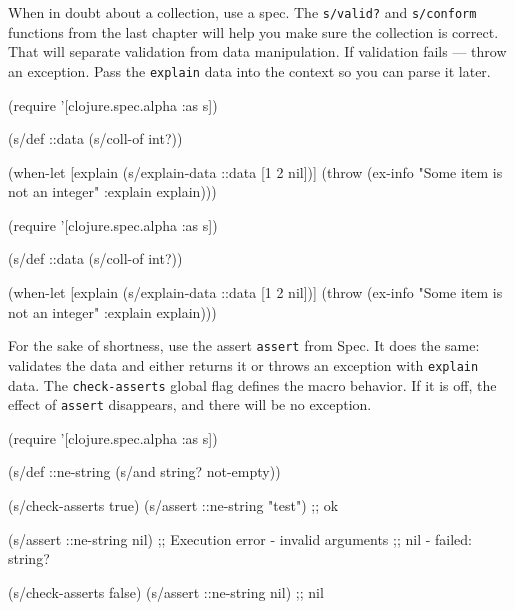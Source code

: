 
When in doubt about a collection, use a spec. The \verb|s/valid?| and \verb|s/conform| functions from the last chapter  will help you make sure the collection is correct. That will separate validation from data manipulation. If validation fails — throw an exception. Pass the \verb|explain| data into the context so you can parse it later.

\ifx\DEVICETYPE\MOBILE

\begin{english}
  \begin{clojure}
(require '[clojure.spec.alpha :as s])

(s/def ::data (s/coll-of int?))

(when-let [explain (s/explain-data
                     ::data
                     [1 2 nil])]
  (throw (ex-info
           "Some item is not an integer"
           {:explain explain})))
  \end{clojure}
\end{english}

\else

\begin{english}
  \begin{clojure}
(require '[clojure.spec.alpha :as s])

(s/def ::data (s/coll-of int?))

(when-let [explain (s/explain-data ::data [1 2 nil])]
  (throw (ex-info "Some item is not an integer"
                  {:explain explain})))
  \end{clojure}
\end{english}

\fi


For the sake of shortness, use the assert \verb|assert| from Spec. It does the same: validates the data and either returns it or throws an exception with \verb|explain| data. The \verb|check-asserts| global flag defines the macro behavior. If it is off, the effect of \verb|assert| disappears, and there will be no exception.

\ifx\DEVICETYPE\MOBILE

\begin{english}
  \begin{clojure}
(require '[clojure.spec.alpha :as s])

(s/def ::ne-string
  (s/and string? not-empty))

(s/check-asserts true)
(s/assert ::ne-string "test") ;; ok

(s/assert ::ne-string nil)
;; Execution error - invalid arguments
;; nil - failed: string?

(s/check-asserts false)
(s/assert ::ne-string nil) ;; nil
  \end{clojure}
\end{english}

